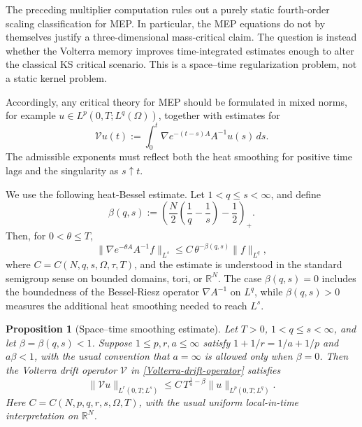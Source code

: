 \documentclass[pdflatex,sn-mathphys-num]{sn-jnl}%
\theoremstyle{thmstyleone}
\newtheorem{proposition}[theorem]{Proposition}%
\theoremstyle{thmstyletwo}
\theoremstyle{thmstylethree}
\begin{document}
The preceding multiplier computation rules out a purely static fourth-order
scaling classification for MEP.  In particular, the MEP equations do not by
themselves justify a three-dimensional mass-critical claim.  
The question is instead whether the Volterra memory improves time-integrated
estimates enough to alter the classical KS critical scenario.  This
is a space--time regularization problem, not a static kernel problem.

Accordingly, any critical theory for MEP should be formulated in mixed norms,
for example \(u\in L^p(0,T;L^q(\Omega))\), together with estimates for
\begin{equation}
        \mathcal V u(t)
        :=
        \int_0^t\nabla e^{-(t-s)A}A^{-1}u(s)\,ds.
\label{Volterra-drift-operator}
\end{equation}
The admissible exponents must reflect both the heat smoothing for positive time
lags and the singularity as \(s\uparrow t\).

We use the following heat-Bessel estimate.  Let \(1<q\le s<\infty\), and define
\begin{equation}
        \beta(q,s):=
        \left(
        \frac{N}{2}\left(\frac1q-\frac1s\right)-\frac12
        \right)_+.
\label{beta-qs}
\end{equation}
Then, for \(0<\theta\le T\),
\begin{equation}
        \|\nabla e^{-\theta A}A^{-1}f\|_{L^s}
        \le
        C\,\theta^{-\beta(q,s)}\|f\|_{L^q},
\label{heat-bessel-estimate}
\end{equation}
where \(C=C(N,q,s,\Omega,\tau,T)\), and the estimate is understood in the
standard semigroup sense on bounded domains, tori, or \(\mathbb R^N\).  The
case \(\beta(q,s)=0\) includes the boundedness of the Bessel-Riesz operator
\(\nabla A^{-1}\) on \(L^q\), while \(\beta(q,s)>0\) measures the additional
heat smoothing needed to reach \(L^s\).

\begin{proposition}[Space--time smoothing estimate]
\label{prop:MEP-spacetime}
Let \(T>0\), \(1<q\le s<\infty\), and let \(\beta=\beta(q,s)<1\).  Suppose
\(1\le p,r,a\le\infty\) satisfy \(1+1/r=1/a+1/p\) and \(a\beta<1\), with the
usual convention that \(a=\infty\) is allowed only when \(\beta=0\).  Then the
Volterra drift operator \(\mathcal V\) in \eqref{Volterra-drift-operator}
satisfies
\begin{equation}
        \|\mathcal V u\|_{L^r(0,T;L^s)}
        \le
        C\,T^{\frac1a-\beta}\|u\|_{L^p(0,T;L^q)}.
\label{MEP-spacetime-estimate}
\end{equation}
Here \(C=C(N,p,q,r,s,\Omega,T)\), with the usual uniform local-in-time
interpretation on \(\mathbb R^N\).
\end{proposition}
\end{document}
